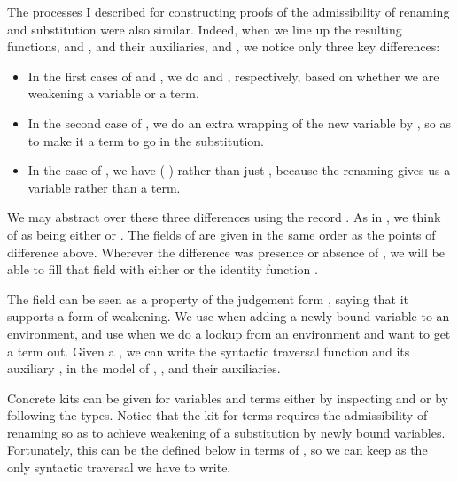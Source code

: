 \Env{}
\RenSub{}

The processes I described for constructing proofs of the admissibility of
renaming and substitution were also similar.
Indeed, when we line up the resulting functions,  and
, and their auxiliaries,  and
, we notice only three key
differences:

\begin{itemize}
  \item In the first cases of  and ,
    we do  and , respectively, based on
    whether we are weakening a variable or a term.
  \item In the second case of , we do an extra wrapping of
    the new variable by , so as to make it a term
    to go in the substitution.
  \item In the  case of , we
    have  \AgdaSymbol(\AgdaBound{$\rho$}
    \AgdaSymbol) rather than just \AgdaBound{$\rho$} ,
    because the renaming \AgdaBound{$\rho$} gives us a variable rather than a
    term.
\end{itemize}

We may abstract over these three differences using the record .
As in , we think of  as being either
\AgdaDatatype{\_$\ni$\_} or \AgdaDatatype{\_$\vdash$\_}.
The fields of  are given in the same order as the points of
difference above.
Wherever the difference was presence or absence of
, we will be able to fill that field with either
 or the identity function .

\Kit{}

The field  can be seen as a property of the
judgement form , saying that it supports a form of weakening.
We use  when adding a newly bound variable to an environment, and
use  when we do a lookup from an environment and want to get a
term out.
Given a  , we can write the syntactic traversal
function  and its auxiliary , in the
model of , , and their auxiliaries.

\trav{}
\bindEnv{}

Concrete kits can be given for variables and terms either by inspecting
 and  or by following the types.
Notice that the kit for terms requires the admissibility of renaming so as to
achieve weakening of a substitution by newly bound variables.
Fortunately, this can be the  defined below in terms of
, so we can keep  as the only syntactic
traversal we have to write.

\begin{multicols}{2}
  \noindent\renKit{} \columnbreak

  \noindent\subKit{}
\end{multicols}
